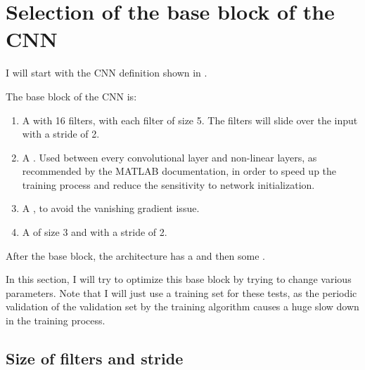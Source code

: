 \section{Selection of the base block of the CNN}\label{sec:cnnbase}

I will start with the CNN definition shown in .



The base block of the CNN is:
\begin{enumerate}
	\item A  with 16 filters,
		with each filter of size 5. The filters will slide over the
		input with a stride of 2.
	\item A . Used between every
		convolutional layer and non-linear layers, as recommended by
		the MATLAB documentation, in order to speed up the training
		process and reduce the sensitivity to network initialization.
	\item A , to avoid the vanishing gradient
		issue.
	\item A  of size 3 and with a stride of 2.
\end{enumerate}

After the base block, the architecture has a  and then some .

In this section, I will try to optimize this base block by trying to change
various parameters. Note that I will just use a training set for these tests,
as the periodic validation of the validation set by the training algorithm
causes a huge slow down in the training process.

\subsection{Size of filters and stride}

